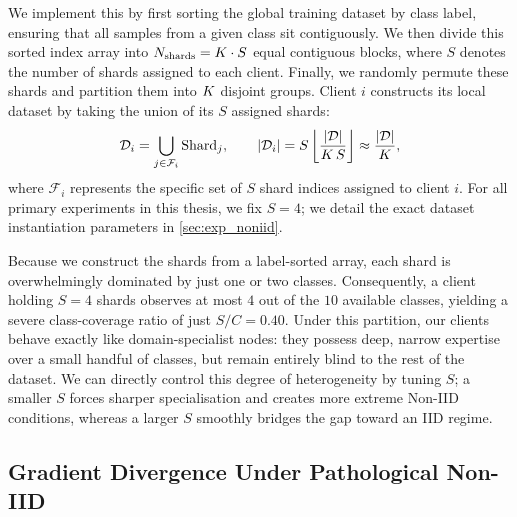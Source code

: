 \documentclass[../main]{subfiles}
\begin{document}
We implement this by first sorting the global training dataset by class label, ensuring that all samples from a given class sit contiguously. We then divide this sorted index array into $N_{\text{shards}} = K \cdot S$ equal contiguous blocks, where $S$ denotes the number of shards assigned to each client. Finally, we randomly permute these shards and partition them into $K$ disjoint groups. Client $i$ constructs its local dataset by taking the union of its $S$ assigned shards:
\begin{equation}
    \mathcal{D}_i = \bigcup_{j \in \mathcal{F}_i} \mathrm{Shard}_j,
    \qquad
    |\mathcal{D}_i| = S \left\lfloor \frac{|\mathcal{D}|}{K\, S} \right\rfloor \approx \frac{|\mathcal{D}|}{K},
    \label{eq:label_shard}
\end{equation}
where $\mathcal{F}_i$ represents the specific set of $S$ shard indices assigned to client $i$. For all primary experiments in this thesis, we fix $S = 4$; we detail the exact dataset instantiation parameters in \cref{sec:exp_noniid}.

Because we construct the shards from a label-sorted array, each shard is overwhelmingly dominated by just one or two classes. Consequently, a client holding $S = 4$ shards observes at most $4$ out of the $10$ available classes, yielding a severe class-coverage ratio of just $S/C = 0.40$. Under this partition, our clients behave exactly like domain-specialist nodes: they possess deep, narrow expertise over a small handful of classes, but remain entirely blind to the rest of the dataset. We can directly control this degree of heterogeneity by tuning $S$; a smaller $S$ forces sharper specialisation and creates more extreme Non-IID conditions, whereas a larger $S$ smoothly bridges the gap toward an IID regime.

\subsection{Gradient Divergence Under Pathological Non-IID}
\label{sec:bg_divergence}
\end{document}
